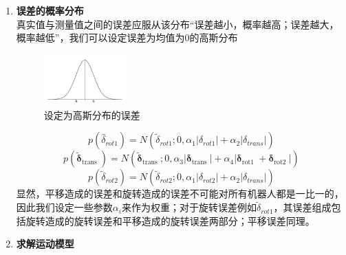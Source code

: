 \documentclass[../main.tex]{subfiles}
\begin{document}
\begin{enumerate}
\begin{enumerate}
         \item \textbf{误差的概率分布}\\
         真实值与测量值之间的误差应服从该分布“误差越小，概率越高；误差越大，概率越低”，我们可以设定误差为均值为0的高斯分布
            \begin{figure}[H]
                \centering
                \includegraphics[width=0.3\textwidth]{images/guass.png}
                \caption{设定为高斯分布的误差}
            \end{figure}
            $$ p( \widehat{\delta }_{rot1})  = N\left( {{\widetilde{\delta }}_{{rot}1};0,{\alpha }_{1}\left| {\delta }_{{rot}1}\right|  + {\alpha }_{2}\left| {\delta }_{trans}\right| }\right) $$
            $$ p\left( {\widetilde{\mathbf{\delta }}}_{\text{trans }}\right)  = N\left( {{\widetilde{\mathbf{\delta }}}_{\text{trans }};0,{\alpha }_{3}\left| {\mathbf{\delta }}_{\text{trans }}\right|  + {\alpha }_{4}\left| {{\mathbf{\delta }}_{\text{rot1 }} + {\mathbf{\delta }}_{\text{rot2 }}}\right| }\right) $$
            $$ p\left( {\widetilde{\delta }}_{rot2}\right)  = N\left( {{\widetilde{\delta }}_{rot2};0,{\alpha }_{1}\left| {\delta }_{rot2}\right|  + {\alpha }_{2}\left| {\delta }_{trans}\right| }\right) $$
                        {\small\kaishu 
            显然，平移造成的误差和旋转造成的误差不可能对所有机器人都是一比一的，因此我们设定一些参数$\alpha_i$来作为权重；对于旋转误差例如${\widetilde{\delta }}_{{rot}1}$，其误差组成包括旋转造成的旋转误差和平移造成的旋转误差两部分；平移误差同理。
            }
        \item \textbf{求解运动模型}
        

\end{enumerate}
\end{enumerate}
\end{document}
